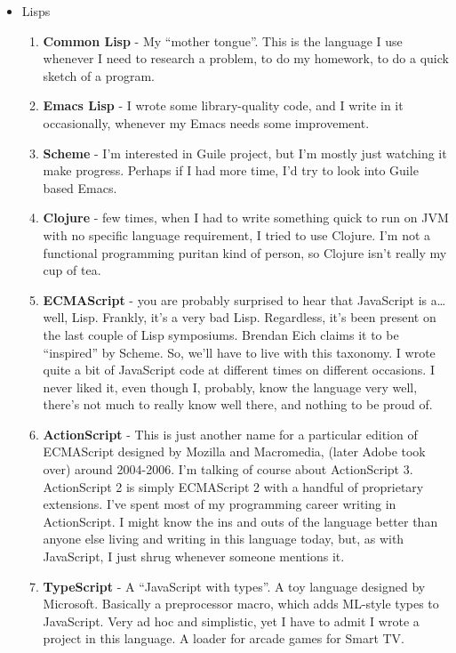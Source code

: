 \documentclass[oneside]{memoir}
\begin{document}
\begin{itemize}
\item Lisps
\begin{enumerate}
\item \textbf{Common Lisp} - My ``mother tongue''.  This is the language I use whenever
I need to research a problem, to do my homework, to do a quick sketch of
a program.
\item \textbf{Emacs Lisp} - I wrote some library-quality code, and I write in it
occasionally, whenever my Emacs needs some improvement.
\item \textbf{Scheme} - I'm interested in Guile project, but I'm mostly just watching
it make progress.  Perhaps if I had more time, I'd try to look into Guile
based Emacs.
\item \textbf{Clojure} - few times, when I had to write something quick to run on JVM
with no specific language requirement, I tried to use Clojure.  I'm not a
functional programming puritan kind of person, so Clojure isn't really my
cup of tea.
\item \textbf{ECMAScript} - you are probably surprised to hear that JavaScript is a\ldots{}
well, Lisp.  Frankly, it's a very bad Lisp.  Regardless, it's been
present on the last couple of Lisp symposiums.  Brendan Eich claims it to
be ``inspired'' by Scheme.  So, we'll have to live with this taxonomy.  I
wrote quite a bit of JavaScript code at different times on different
occasions.  I never liked it, even though I, probably, know the language
very well, there's not much to really know well there, and nothing to be
proud of.
\item \textbf{ActionScript} - This is just another name for a particular edition of 
ECMAScript designed by Mozilla and Macromedia, (later Adobe took over)
around 2004-2006.  I'm talking of course about ActionScript 3.
ActionScript 2 is simply ECMAScript 2 with a handful of proprietary
extensions.  I've spent most of my programming career writing in
ActionScript.  I might know the ins and outs of the language better than
anyone else living and writing in this language today, but, as with
JavaScript, I just shrug whenever someone mentions it.
\item \textbf{TypeScript} - A ``JavaScript with types''.  A toy language designed by
Microsoft.  Basically a preprocessor macro, which adds ML-style types
to JavaScript.  Very ad hoc and simplistic, yet I have to admit I wrote
a project in this language.  A loader for arcade games for Smart TV.
\end{enumerate}


\end{itemize}
\end{document}
